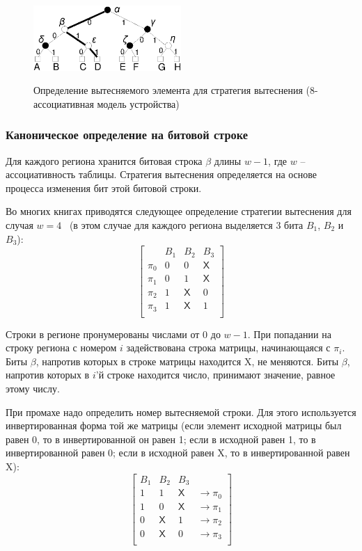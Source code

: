 \begin{figure}[h] \center
  \includegraphics[width=0.5\textwidth]{2.theor/plrumiss}\\
  \caption{Определение вытесняемого элемента для стратегия вытеснения
  \PseudoLRU (8-ассоциативная модель устройства)}\label{pseudo_lru_miss}
\end{figure}


\subsubsection{Каноническое определение \PseudoLRU на битовой строке}

Для каждого региона хранится битовая строка $\beta$ длины $w{-}1$, где $w$ -- ассоциативность таблицы. Стратегия вытеснения определяется на основе процесса изменения бит этой битовой строки.

Во многих книгах приводятся следующее определение стратегии вытеснения \PseudoLRU для случая
$w=4$~\cite{FundamentalOfComputerOrganizationAndDesign} (в этом случае для каждого региона выделяется 3 бита $B_1$, $B_2$ и $B_3$):
$$ \left[
  \begin{array}{c|ccc}
          & B_1 & B_2 & B_3 \\ \hline
    \pi_0 & 0 & 0 & \textsf{X} \\
    \pi_1 & 0 & 1 & \textsf{X} \\
    \pi_2 & 1 & \textsf{X} & 0 \\
    \pi_3 & 1 & \textsf{X} & 1 \\
  \end{array}
\right]
$$

Строки в регионе пронумерованы числами от 0 до $w{-}1$. При попадании на строку
региона с номером $i$ задействована строка матрицы, начинающаяся с $\pi_i$. Биты
$\beta$, напротив которых в строке матрицы находится \textsf{X}, не меняются.
Биты $\beta$, напротив которых в $i$'й строке находится число, принимают
значение, равное этому числу.

При промахе надо определить номер вытесняемой строки. Для этого используется
инвертированная форма той же матрицы (если элемент исходной матрицы был равен 0, то в инвертированной он равен 1; если в исходной равен 1, то в инвертированной равен 0; если в исходной равен \textsf{X}, то в инвертированной равен \textsf{X}):
$$
\left[
  \begin{array}{ccc|c}
    B_1 & B_2 & B_3 & \\ \hline
    1 & 1 & \textsf{X} & \rightarrow \pi_0 \\
    1 & 0 & \textsf{X} & \rightarrow \pi_1 \\
    0 & \textsf{X} & 1 & \rightarrow \pi_2 \\
    0 & \textsf{X} & 0 & \rightarrow \pi_3 \\
  \end{array}
\right]
$$

